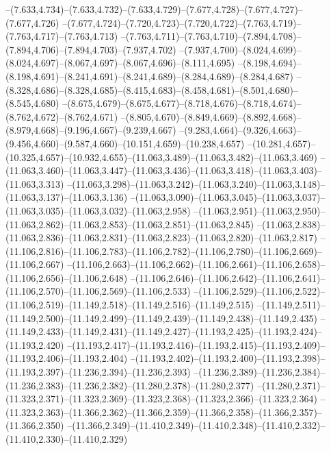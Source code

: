   --(7.633,4.734)--(7.633,4.732)--(7.633,4.729)--(7.677,4.728)--(7.677,4.727)--(7.677,4.726)%
  --(7.677,4.724)--(7.720,4.723)--(7.720,4.722)--(7.763,4.719)--(7.763,4.717)--(7.763,4.713)%
  --(7.763,4.711)--(7.763,4.710)--(7.894,4.708)--(7.894,4.706)--(7.894,4.703)--(7.937,4.702)%
  --(7.937,4.700)--(8.024,4.699)--(8.024,4.697)--(8.067,4.697)--(8.067,4.696)--(8.111,4.695)%
  --(8.198,4.694)--(8.198,4.691)--(8.241,4.691)--(8.241,4.689)--(8.284,4.689)--(8.284,4.687)%
  --(8.328,4.686)--(8.328,4.685)--(8.415,4.683)--(8.458,4.681)--(8.501,4.680)--(8.545,4.680)%
  --(8.675,4.679)--(8.675,4.677)--(8.718,4.676)--(8.718,4.674)--(8.762,4.672)--(8.762,4.671)%
  --(8.805,4.670)--(8.849,4.669)--(8.892,4.668)--(8.979,4.668)--(9.196,4.667)--(9.239,4.667)%
  --(9.283,4.664)--(9.326,4.663)--(9.456,4.660)--(9.587,4.660)--(10.151,4.659)--(10.238,4.657)%
  --(10.281,4.657)--(10.325,4.657)--(10.932,4.655)--(11.063,3.489)--(11.063,3.482)--(11.063,3.469)%
  --(11.063,3.460)--(11.063,3.447)--(11.063,3.436)--(11.063,3.418)--(11.063,3.403)--(11.063,3.313)%
  --(11.063,3.298)--(11.063,3.242)--(11.063,3.240)--(11.063,3.148)--(11.063,3.137)--(11.063,3.136)%
  --(11.063,3.090)--(11.063,3.045)--(11.063,3.037)--(11.063,3.035)--(11.063,3.032)--(11.063,2.958)%
  --(11.063,2.951)--(11.063,2.950)--(11.063,2.862)--(11.063,2.853)--(11.063,2.851)--(11.063,2.845)%
  --(11.063,2.838)--(11.063,2.836)--(11.063,2.831)--(11.063,2.823)--(11.063,2.820)--(11.063,2.817)%
  --(11.106,2.816)--(11.106,2.783)--(11.106,2.782)--(11.106,2.780)--(11.106,2.669)--(11.106,2.667)%
  --(11.106,2.663)--(11.106,2.662)--(11.106,2.661)--(11.106,2.658)--(11.106,2.656)--(11.106,2.648)%
  --(11.106,2.646)--(11.106,2.642)--(11.106,2.641)--(11.106,2.570)--(11.106,2.569)--(11.106,2.533)%
  --(11.106,2.529)--(11.106,2.522)--(11.106,2.519)--(11.149,2.518)--(11.149,2.516)--(11.149,2.515)%
  --(11.149,2.511)--(11.149,2.500)--(11.149,2.499)--(11.149,2.439)--(11.149,2.438)--(11.149,2.435)%
  --(11.149,2.433)--(11.149,2.431)--(11.149,2.427)--(11.193,2.425)--(11.193,2.424)--(11.193,2.420)%
  --(11.193,2.417)--(11.193,2.416)--(11.193,2.415)--(11.193,2.409)--(11.193,2.406)--(11.193,2.404)%
  --(11.193,2.402)--(11.193,2.400)--(11.193,2.398)--(11.193,2.397)--(11.236,2.394)--(11.236,2.393)%
  --(11.236,2.389)--(11.236,2.384)--(11.236,2.383)--(11.236,2.382)--(11.280,2.378)--(11.280,2.377)%
  --(11.280,2.371)--(11.323,2.371)--(11.323,2.369)--(11.323,2.368)--(11.323,2.366)--(11.323,2.364)%
  --(11.323,2.363)--(11.366,2.362)--(11.366,2.359)--(11.366,2.358)--(11.366,2.357)--(11.366,2.350)%
  --(11.366,2.349)--(11.410,2.349)--(11.410,2.348)--(11.410,2.332)--(11.410,2.330)--(11.410,2.329)%
